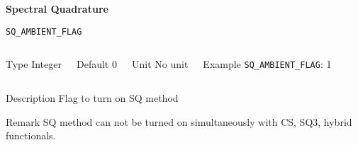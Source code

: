 
\begin{frame}[allowframebreaks,c]{} \label{SQ}

\begin{center}
\Huge \textbf{Spectral Quadrature}
\end{center}

\end{frame}

\begin{frame}[allowframebreaks]{\texttt{SQ\_AMBIENT\_FLAG}} \label{SQ_AMBIENT_FLAG}
\vspace*{-12pt}
\begin{columns}
\begin{block}{Type}
Integer
\end{block}

\begin{block}{Default}
0
\end{block}

\begin{block}{Unit}
No unit
\end{block}

\begin{block}{Example}
\texttt{SQ\_AMBIENT\_FLAG}: 1
\end{block}
\end{columns}

\begin{block}{Description}
Flag to turn on SQ method 
\end{block}

\begin{block}{Remark}
SQ method can not be turned on simultaneously with CS, SQ3, hybrid functionals. 
\end{block}

\end{frame}


